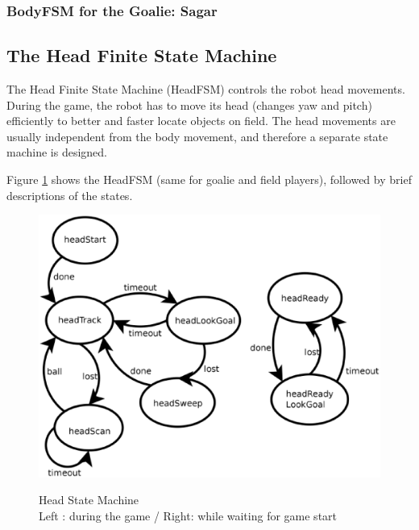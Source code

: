 \documentclass{article}
\begin{document}
\subsubsection{BodyFSM for the Goalie: Sagar}

\subsection{The Head Finite State Machine}
	The Head Finite State Machine (HeadFSM) controls the robot head movements. During the game, the robot has to move its head (changes yaw and pitch) efficiently to better and faster locate objects on field. The head movements are usually independent from the body movement, and therefore a separate state machine is designed. 

	Figure \ref{fig:headfsm} shows the HeadFSM (same for goalie and field players), followed by brief descriptions of the states. 
		
	\begin{figure}[H]
		\centering
		\includegraphics[width=.8\textwidth]{figures/HeadFSM.eps}
		\label{fig:headfsm}
		\caption{Head State Machine\\Left : during the game / Right: while waiting for game start }
		\label{fig:headfsm}
	\end{figure}
\end{document}
